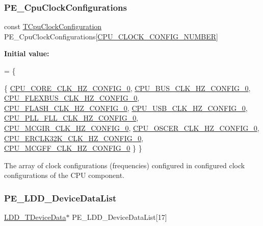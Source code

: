 \subsubsection{\texorpdfstring{P\+E\+\_\+\+Cpu\+Clock\+Configurations}{PE\_CpuClockConfigurations}}
{\footnotesize\ttfamily const \hyperlink{struct_t_cpu_clock_configuration}{T\+Cpu\+Clock\+Configuration} P\+E\+\_\+\+Cpu\+Clock\+Configurations\mbox{[}\hyperlink{group___cpu__module_ga37d43e31f65dd620040aec363e95b5a8}{C\+P\+U\+\_\+\+C\+L\+O\+C\+K\+\_\+\+C\+O\+N\+F\+I\+G\+\_\+\+N\+U\+M\+B\+ER}\mbox{]}}

{\bfseries Initial value\+:}
\begin{DoxyCode}
= \{
  
  \{
    \hyperlink{group___cpu__module_ga6fe0b841d40421ee48af4a4e01e48ddf}{CPU\_CORE\_CLK\_HZ\_CONFIG\_0},          
    \hyperlink{group___cpu__module_gaf060a047649b9537eb77354ab7917a8b}{CPU\_BUS\_CLK\_HZ\_CONFIG\_0},           
    \hyperlink{group___cpu__module_ga706c0d4dd14c93181b7a99badddc9a51}{CPU\_FLEXBUS\_CLK\_HZ\_CONFIG\_0},       
    \hyperlink{group___cpu__module_ga09c9820f38d931a0400b832d2582c6f7}{CPU\_FLASH\_CLK\_HZ\_CONFIG\_0},         
    \hyperlink{group___cpu__module_ga7bf843fdf59af5fcaf48bea898884a3e}{CPU\_USB\_CLK\_HZ\_CONFIG\_0},           
    \hyperlink{group___cpu__module_gad2aaa2918b640ae3833fc84e8f983c3c}{CPU\_PLL\_FLL\_CLK\_HZ\_CONFIG\_0},       
    \hyperlink{group___cpu__module_ga860e7441eac7d5e35385bcd62b019d9d}{CPU\_MCGIR\_CLK\_HZ\_CONFIG\_0},         
    \hyperlink{group___cpu__module_ga2960ebfe6475f475999ea8f1d5448483}{CPU\_OSCER\_CLK\_HZ\_CONFIG\_0},         
    \hyperlink{group___cpu__module_ga092702a75fd1041eb311850abb022240}{CPU\_ERCLK32K\_CLK\_HZ\_CONFIG\_0},      
    \hyperlink{group___cpu__module_gafd8ec2ac4ea47574f95d0e5a6f80807e}{CPU\_MCGFF\_CLK\_HZ\_CONFIG\_0}          
  \}
\}
\end{DoxyCode}
The array of clock configurations (frequencies) configured in configured clock configurations of the C\+PU component. \mbox{\label{group___p_e___l_d_d__module_gad5cf9320092cdbfaf70c3eac78567de5}} 
\subsubsection{\texorpdfstring{P\+E\+\_\+\+L\+D\+D\+\_\+\+Device\+Data\+List}{PE\_LDD\_DeviceDataList}}
{\footnotesize\ttfamily \hyperlink{group___p_e___types__module_gac5cf1362f1f0e3a2ce71b1bf2276d091}{L\+D\+D\+\_\+\+T\+Device\+Data}$\ast$ P\+E\+\_\+\+L\+D\+D\+\_\+\+Device\+Data\+List\mbox{[}17\mbox{]}}

